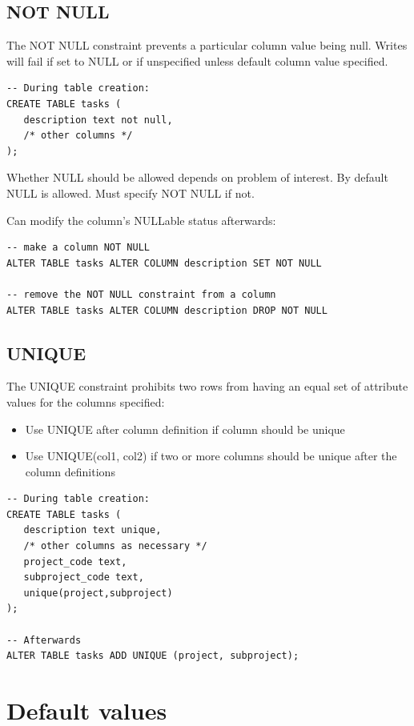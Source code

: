 \documentclass{pgnotes}
\begin{document}
\subsection{NOT NULL}\label{not-null}

The NOT NULL constraint prevents a particular column value being null.
Writes will fail if set to NULL or if unspecified unless default column value specified.

\begin{verbatim}
-- During table creation:
CREATE TABLE tasks (
   description text not null,
   /* other columns */
);
\end{verbatim}


Whether NULL should be allowed depends on problem of interest.
By default NULL is allowed.
Must specify NOT NULL if not.

Can modify the column's NULLable status afterwards:
\begin{verbatim}
-- make a column NOT NULL
ALTER TABLE tasks ALTER COLUMN description SET NOT NULL

-- remove the NOT NULL constraint from a column
ALTER TABLE tasks ALTER COLUMN description DROP NOT NULL
\end{verbatim}


\subsection{UNIQUE}\label{unique}

The UNIQUE constraint prohibits two rows from having an equal set of
attribute values for the columns specified:

\begin{itemize}
\item Use UNIQUE after column definition if column should be unique
\item Use UNIQUE(col1, col2) if two or more columns should be unique after the column definitions
\end{itemize}


\begin{verbatim}
-- During table creation:
CREATE TABLE tasks (
   description text unique,
   /* other columns as necessary */
   project_code text,
   subproject_code text,
   unique(project,subproject)
); 

-- Afterwards
ALTER TABLE tasks ADD UNIQUE (project, subproject);
\end{verbatim}

\section{Default values}
\label{sec:default-values}
\end{document}
